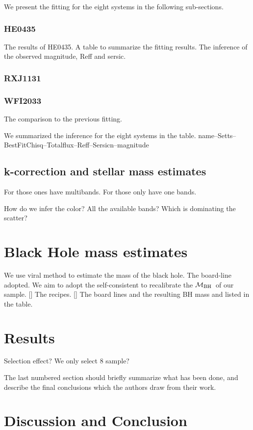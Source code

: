 \documentclass[fleqn,usenatbib]{mnras}
\newcommand{\mbh}{$\mathcal M_{\rm BH}$}
\begin{document}
We present the fitting for the eight systems in the following sub-sections.

\subsubsection{HE0435}
The results of HE0435. A table to summarize the fitting results. The inference of the observed magnitude, Reff and sersic. 

\subsubsection{RXJ1131}

\subsubsection{WFI2033}

The comparison to the previous fitting.

We summarized the inference for the eight systems in the table.
name--Setts--BestFitChisq--Totalflux--Reff--Sersicn--magnitude

\subsection{k-correction and stellar mass estimates}
For those ones have multibands. For those only have one bands.

How do we infer the color? All the available bands? Which is dominating the scatter?

\section{Black Hole mass estimates}
We use viral method to estimate the mass of the black hole. The board-line adopted. We aim to adopt the self-consistent to recalibrate the \mbh~of our sample. [] The recipes. [] The board lines and the resulting BH mass and listed in the table. 

\section{Results}

Selection effect? We only select 8 sample?

The last numbered section should briefly summarize what has been done, and describe
the final conclusions which the authors draw from their work.

\section{Discussion and Conclusion}
\end{document}
